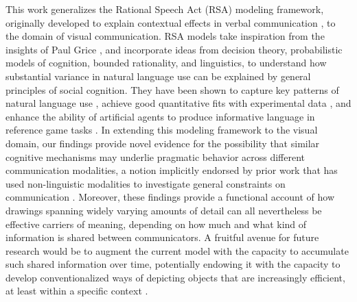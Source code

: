 \documentclass[9pt,twocolumn,twoside]{pnas-new}
\begin{document}
This work generalizes the Rational Speech Act (RSA) modeling framework, originally developed to explain contextual effects in verbal communication \cite{frank2012predicting,goodman2013knowledge,franke2016probabilistic,bergen2016pragmatic}, to the domain of visual communication.
RSA models take inspiration from the insights of Paul Grice \cite{grice1975syntax}, and incorporate ideas from decision theory, probabilistic models of cognition, bounded rationality, and linguistics, to understand how substantial variance in natural language use can be explained by general principles of social cognition. 
They have been shown to capture key patterns of natural language use \cite{goodman2013knowledge}, achieve good quantitative fits with experimental data \cite{kao2014formalizing}, and enhance the ability of artificial agents to produce informative language in reference game tasks \cite{monroe2017colors,Cohn-GordonGP18}.
In extending this modeling framework to the visual domain, our findings provide novel evidence for the possibility that similar cognitive mechanisms may underlie pragmatic behavior across different communication modalities, a notion implicitly endorsed by prior work that has used non-linguistic modalities to investigate general constraints on communication 
\cite{goldin1977development,Garrod:2007wk,fay2010interactive,theisen2010systematicity,garrod2010can,Galantucci:2005uh,verhoef2014emergence}. %
Moreover, these findings provide a functional account of how drawings spanning widely varying amounts of detail can all nevertheless be effective carriers of meaning, depending on how much and what kind of information is shared between communicators. 
A fruitful avenue for future research would be to augment the current model with the capacity to accumulate such shared information over time, potentially endowing it with the capacity to develop conventionalized ways of depicting objects that are increasingly efficient, at least within a specific context \cite{Garrod:2007wk}. 


\end{document}
